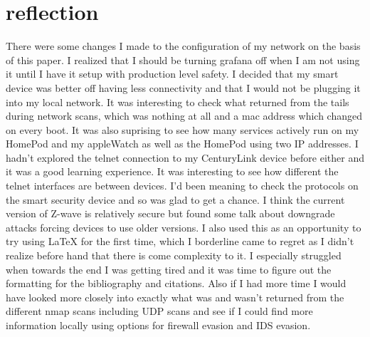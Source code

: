\documentclass[10pt]{article}
\begin{document}
\section*{reflection}
There were some changes I made to the configuration of my network on the basis of this paper. I realized that I should be turning 
grafana off when I am not using it until I have it setup with production level safety. I decided that my smart device was better off 
having less connectivity and that I would not be plugging it into my local network. It was interesting to check what returned from the 
tails during network scans, which was nothing at all and a mac address which changed on every boot. It was also suprising to see how
many services actively run on my HomePod and my appleWatch as well as the HomePod using two IP addresses. I hadn't explored the telnet
connection to my CenturyLink device before either and it was a good learning experience. It was interesting to see how different the telnet
interfaces are between devices. I'd been meaning to check the protocols on the smart security device and so was glad to get a chance. I 
think the current version of Z-wave is relatively secure but found some talk about downgrade attacks forcing devices to use older
versions. I also used this as an opportunity to try using LaTeX for the first time, which I borderline came to regret as I didn't realize
before hand that there is come complexity to it. I especially struggled when towards the end I was getting tired and it was time to figure 
out the formatting for the bibliography and citations. Also if I had more time I would have looked more closely into exactly what was and 
wasn't returned from the different nmap scans including UDP scans and see if I could find more information locally using options for firewall 
evasion and IDS evasion.
\end{document}
